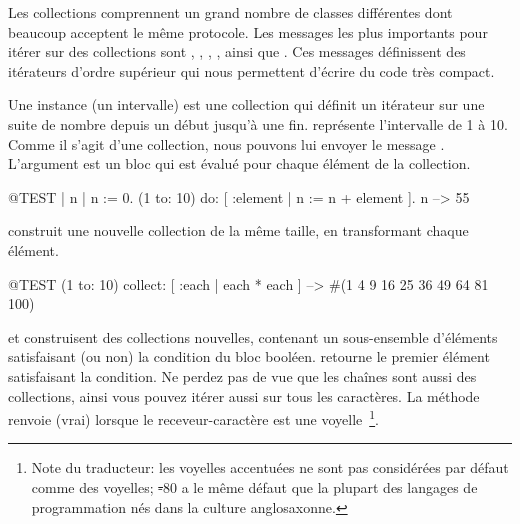 \documentclass[a4paper,10pt,twoside]{book}
\begin{document}
Les collections comprennent un grand nombre de classes diff\'{e}rentes
dont beaucoup acceptent le m\^{e}me protocole.
Les messages les plus importants pour it\'{e}rer sur des collections 
sont 
, , , ,  ainsi que  .
Ces messages d\'{e}finissent des it\'{e}rateurs d'ordre sup\'erieur qui nous permettent d'\'{e}crire du code tr\`{e}s compact.

Une instance  (\ie un intervalle) est une collection qui d\'{e}finit un it\'{e}rateur sur une suite de nombre depuis un d\'{e}but jusqu'\`{a} une fin.
 repr\'{e}sente l'intervalle de 1 \`{a} 10.
Comme il s'agit d'une collection, nous pouvons lui envoyer le message .
L'argument est un bloc qui est \'{e}valu\'{e} pour chaque \'{e}l\'{e}ment de la collection.

\begin{code}{@TEST | n |}
n := 0.
(1 to: 10) do: [ :element | n := n + element ].
n --> 55
\end{code}

 construit une nouvelle collection de la m\^{e}me taille, en transformant chaque \'{e}l\'{e}ment.
\begin{code}{@TEST}
(1 to: 10) collect: [ :each | each * each ] --> #(1 4 9 16 25 36 49 64 81 100)
\end{code}

 et  construisent des collections nouvelles, contenant un sous-ensemble d'\'{e}l\'{e}ments satisfaisant (ou non) la condition du bloc bool\'{e}en.
 retourne le premier \'{e}l\'{e}ment satisfaisant la condition.
Ne perdez pas de vue que les chaînes sont aussi des collections, ainsi
vous pouvez it\'{e}rer aussi sur tous les caract\`{e}res.
La m\'ethode  renvoie  (\ie vrai)
lorsque le receveur-caract\`ere est une \label{def:isVowel}
voyelle~\footnote{Note du traducteur: les voyelles accentu\'ees ne sont
  pas consid\'er\'ees par d\'efaut comme des voyelles; \st-80 a le
  m\^eme d\'efaut que la plupart des langages de programmation n\'es
  dans la culture anglosaxonne.}.
\end{document}
